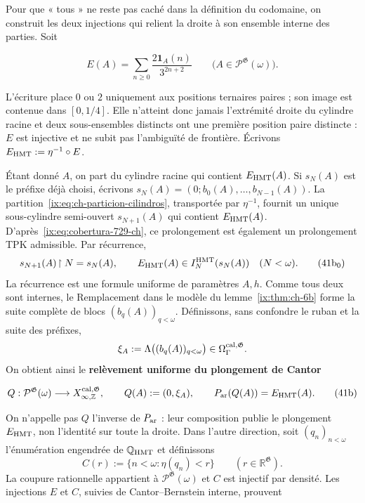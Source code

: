 Pour que « tous » ne reste pas caché dans la définition du codomaine, on construit
les deux injections qui relient la droite à son ensemble interne des parties. Soit

\[
 E(A)=\sum_{n\ge0}\frac{2\mathbf1_A(n)}{3^{2n+2}}
 \qquad
 \bigl(A\in\mathcal P^{\mathfrak G}(\omega)\bigr).
\tag{41a}\label{ix:eq:ch-incrustacion-cantor}
\]

L’écriture place \(0\) ou \(2\) uniquement aux positions ternaires
paires ; son image est contenue dans \([0,1/4]\). Elle n’atteint donc jamais
l’extrémité droite du cylindre racine et deux sous-ensembles distincts ont une
première position paire distincte : \(E\) est injective et ne subit pas l’ambiguïté de
frontière. Écrivons \(E_{\rm HMT}:=\eta^{-1}\circ E\).

Étant donné \(A\), on part du cylindre racine qui contient \(E_{\rm HMT}(A)\). Si \(s_N(A)\) est le préfixe déjà choisi, écrivons \(s_N(A)=(0;b_0(A),\ldots,b_{N-1}(A))\). La partition~\eqref{ix:eq:ch-particion-cilindros}, transportée par \(\eta^{-1}\), fournit un unique sous-cylindre semi-ouvert \(s_{N+1}(A)\) qui contient \(E_{\rm HMT}(A)\). D'après~\eqref{ix:eq:cobertura-729-ch}, ce prolongement est également un prolongement TPK admissible. Par récurrence,
\[
 s_{N+1}(A)\!\upharpoonright N=s_N(A),\qquad
 E_{\rm HMT}(A)\in I_N^{\rm HMT}(s_N(A))\quad(N<\omega).
\tag{41b$_0$}\label{ix:eq:ch-prefijos-uniformes}
\]
La récurrence est une formule uniforme de paramètres \(A,h\). Comme tous deux sont
internes, le Remplacement dans le modèle du lemme~\ref{ix:thm:ch-6b} forme la suite complète de
blocs \((b_q(A))_{q<\omega}\). Définissons, sans confondre le ruban et la
suite des préfixes,
\[
 \xi_A:=\Lambda\bigl((b_q(A))_{q<\omega}\bigr)
 \in\Omega_\Gamma^{\rm cal,\mathfrak G}.
\]
On obtient ainsi le \textbf{relèvement uniforme du plongement de Cantor}

\[
 Q:\mathcal P^{\mathfrak G}(\omega)
 \longrightarrow X_{\infty,\mathbb Z}^{\rm cal,\mathfrak G},
 \qquad
 Q(A):=(0,\xi_A),\qquad
 P_{\rm ar}(Q(A))=E_{\rm HMT}(A).
\tag{41b}\label{ix:eq:ch-levantamiento-uniforme}
\]

On n’appelle pas \(Q\) l’inverse de \(P_{\rm ar}\) : leur composition publie le
plongement \(E_{\rm HMT}\), non l’identité sur toute la droite. Dans l’autre
direction, soit \((q_n)_{n<\omega}\) l’énumération engendrée de
\(\mathbb Q_{\rm HMT}\) et définissons
\[
 C(r):=\{n<\omega:\eta(q_n)<r\}
 \qquad(r\in\mathbb R^{\mathfrak G}).
\]
La coupure rationnelle appartient à \(\mathcal P^{\mathfrak G}(\omega)\) et \(C\) est injectif par densité. Les injections \(E\) et \(C\), suivies de Cantor--Bernstein interne, prouvent

